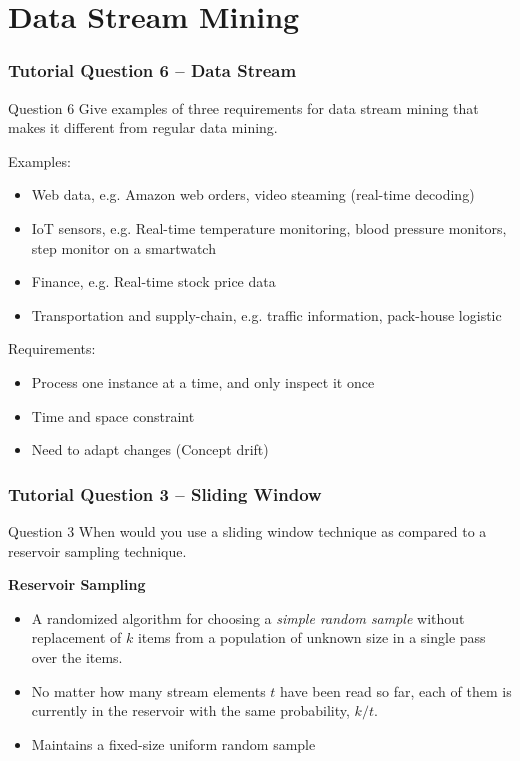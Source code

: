\documentclass[aspectratio=169, 10pt]{beamer}
\begin{document}
\section{Data Stream Mining}
\begin{frame}
    \frametitle{Tutorial Question 6 -- Data Stream}
    
    \begin{block}{Question 6}
        Give examples of three requirements for data stream mining that makes it different from regular data mining.
    \end{block}

    Examples:
    \begin{itemize}
        \item Web data, e.g. Amazon web orders, video steaming (real-time decoding)
        \item IoT sensors, e.g. Real-time temperature monitoring, blood pressure monitors, step monitor on a smartwatch
        \item Finance, e.g. Real-time stock price data
        \item Transportation and supply-chain, e.g. traffic information, pack-house logistic
    \end{itemize}

    Requirements:
    \begin{itemize}
        \item Process one instance at a time, and only inspect it once
        \item Time and space constraint
        \item Need to adapt changes (Concept drift)
    \end{itemize}
\end{frame}

\begin{frame}
    \frametitle{Tutorial Question 3 -- Sliding Window}
    
    \begin{block}{Question 3}
        When would you use a sliding window technique as compared to a reservoir sampling technique.
    \end{block}

    \textbf{Reservoir Sampling}
    \begin{itemize}
        \item A randomized algorithm for choosing a {\em simple random sample} without
        replacement of $k$ items from a population of unknown size in a single
        pass over the items.
        \item No matter how many stream elements $t$ have been read
        so far, each of them is currently in the reservoir with the same
        probability, $k/t$.
        \item Maintains a fixed-size uniform random sample
    \end{itemize}
\end{frame}
\end{document}
